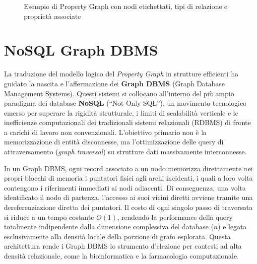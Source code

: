 \begin{figure}[ht!]
\centering
{}
\caption{Esempio di Property Graph con nodi etichettati, tipi di relazione 
e proprietà associate}
\label{fig:property_graph_example}
\end{figure}

\section{NoSQL Graph DBMS}
La traduzione del modello logico del \textit{Property Graph} in strutture  efficienti ha guidato la nascita e l'affermazione dei \textbf{Graph DBMS} (Graph Database Management Systems). Questi sistemi si collocano all'interno del più ampio paradigma dei database \textbf{NoSQL} (``Not Only SQL''), un movimento tecnologico emerso per superare la rigidità strutturale, i limiti di scalabilità verticale e le inefficienze computazionali dei tradizionali sistemi relazionali (RDBMS) di fronte a carichi di lavoro non convenzionali.
L'obiettivo primario non è la memorizzazione di entità disconnesse, ma l'ottimizzazione delle query di attraversamento (\textit{graph traversal}) su strutture dati massivamente interconnesse.

In un Graph DBMS, ogni record associato a un nodo memorizza direttamente nei propri blocchi di memoria i puntatori fisici agli archi incidenti, i quali a loro volta contengono i riferimenti immediati ai nodi adiacenti. Di conseguenza, una volta identificato il nodo di partenza, l'accesso ai suoi vicini diretti avviene tramite una dereferenziazione diretta dei puntatori. Il costo di ogni singolo passo di traversata si riduce a un tempo costante $O(1)$, rendendo la performance della query totalmente indipendente dalla dimensione complessiva del database ($n$) e legata esclusivamente alla densità locale della porzione di grafo esplorata. Questa architettura rende i Graph DBMS lo strumento d'elezione per contesti ad alta densità relazionale, come la bioinformatica e la farmacologia computazionale. 

